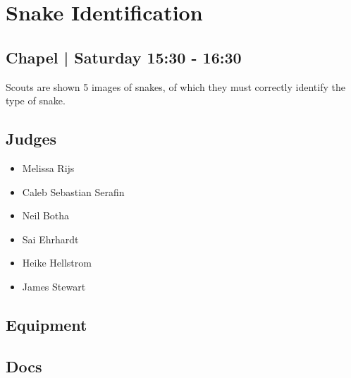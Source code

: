 \documentclass[10pt]{article}
\begin{document}
		\begin{minipage}{\linewidth}
		\setcounter{section}{11}
	\section{Snake Identification }
	\subsection*{Chapel | Saturday 15:30 - 16:30}

	Scouts are shown 5 images of snakes, of which they must correctly identify the type of snake.

	\begin{multicols}{2}
	\subsection*{\faUsers \: Judges}
	\begin{itemize}
			\item Melissa Rijs
			\item Caleb Sebastian Serafin
			\item Neil Botha
			\item Sai Ehrhardt
			\item Heike Hellstrom
			\item James Stewart
		\end{itemize}
	\columnbreak
	\subsection*{\faWrench \: Equipment}
	        \vfill\null
        \subsection*{\faFile \: Docs}
     	\end{multicols}


	\vspace{1cm}
	\end{minipage}
\end{document}
